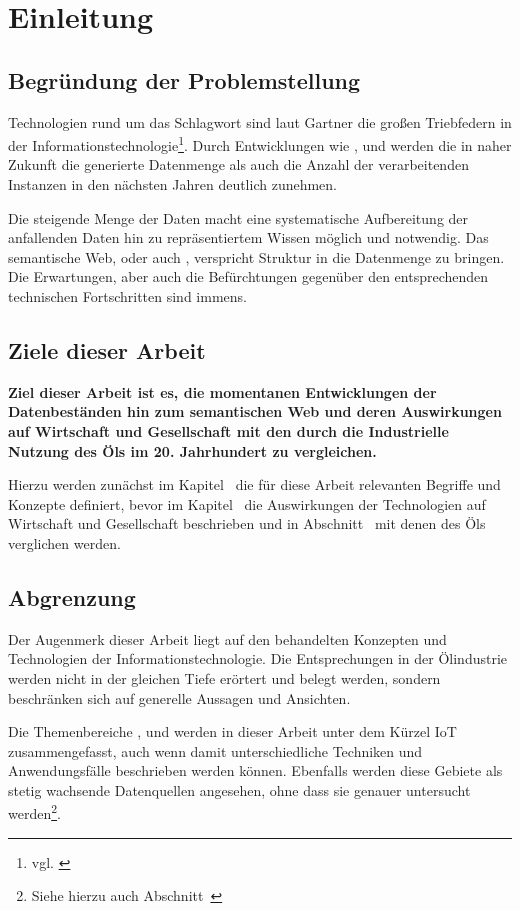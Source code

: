 \section{Einleitung}
\label{sec:einleitung}

\subsection{Begründung der Problemstellung}

Technologien rund um das Schlagwort  sind laut Gartner die großen Triebfedern in der Informationstechnologie\footnote{vgl. \cite{gartner2014}}. Durch Entwicklungen wie ,  und  werden die in naher Zukunft die generierte Datenmenge als auch die Anzahl der verarbeitenden Instanzen in den nächsten Jahren deutlich zunehmen.

Die steigende Menge der Daten macht eine systematische Aufbereitung der anfallenden Daten hin zu repräsentiertem Wissen möglich und notwendig. Das semantische Web, oder auch , verspricht Struktur in die Datenmenge zu bringen. Die Erwartungen, aber auch die Befürchtungen gegenüber den entsprechenden technischen Fortschritten sind immens.

\subsection{Ziele dieser Arbeit}

\textbf{Ziel dieser Arbeit ist es, die momentanen Entwicklungen der Datenbeständen hin zum semantischen Web und deren Auswirkungen auf Wirtschaft und Gesellschaft mit den durch die Industrielle Nutzung des Öls im 20. Jahrhundert zu vergleichen.}

Hierzu werden zunächst im Kapitel~ die für diese Arbeit relevanten Begriffe und Konzepte definiert, bevor im Kapitel~ die Auswirkungen der Technologien auf Wirtschaft und Gesellschaft beschrieben und in Abschnitt~ mit denen des Öls verglichen werden.

\subsection{Abgrenzung}

Der Augenmerk dieser Arbeit liegt auf den behandelten Konzepten und Technologien der Informationstechnologie. Die Entsprechungen in der Ölindustrie werden nicht in der gleichen Tiefe erörtert und belegt werden, sondern beschränken sich auf generelle Aussagen und Ansichten.

Die Themenbereiche ,  und  werden in dieser Arbeit unter dem Kürzel \ac{IoT} zusammengefasst, auch wenn damit unterschiedliche Techniken und Anwendungsfälle beschrieben werden können. Ebenfalls werden diese Gebiete als stetig wachsende Datenquellen angesehen, ohne dass sie genauer untersucht werden\footnote{Siehe hierzu auch Abschnitt~}.